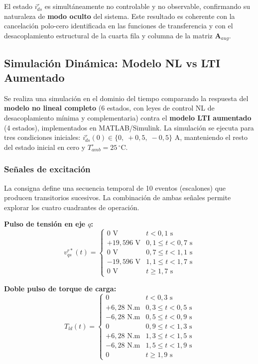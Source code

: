 \documentclass[12pt, a4paper,journal, onecolumn, compsoc]{IEEEtran}
\begin{document}
El estado $i_{ds}^r$ es simultáneamente no controlable y no observable, confirmando su naturaleza de \textbf{modo oculto} del sistema. Este resultado es coherente con la cancelación polo-cero identificada en las funciones de transferencia y con el desacoplamiento estructural de la cuarta fila y columna de la matriz $\mathbf{A}_{aug}$.

\subsection{Simulación Dinámica: Modelo NL vs LTI Aumentado}
\label{sec:sim_dinamica}

Se realiza una simulación en el dominio del tiempo comparando la respuesta del \textbf{modelo no lineal completo} (6 estados, con leyes de control NL de desacoplamiento mínima y complementaria) contra el \textbf{modelo LTI aumentado} (4 estados), implementados en MATLAB/Simulink. La simulación se ejecuta para tres condiciones iniciales: $i_{ds}^r(0) \in \{0,\; +0{,}5,\; -0{,}5\}$ A, manteniendo el resto del estado inicial en cero y $T_{amb}^\circ = 25\,^\circ$C.

\subsubsection{Señales de excitación}

La consigna define una secuencia temporal de 10 eventos (escalones) que producen transitorios sucesivos. La combinación de ambas señales permite explorar los cuatro cuadrantes de operación.

\textbf{Pulso de tensión en eje $q$:}
\begin{equation}
v_{qs}^{r*}(t) = \begin{cases}
0 \text{ V} & t < 0{,}1 \text{ s} \\
+19{,}596 \text{ V} & 0{,}1 \leq t < 0{,}7 \text{ s} \\
0 \text{ V} & 0{,}7 \leq t < 1{,}1 \text{ s} \\
-19{,}596 \text{ V} & 1{,}1 \leq t < 1{,}7 \text{ s} \\
0 \text{ V} & t \geq 1{,}7 \text{ s}
\end{cases}
\end{equation}

\textbf{Doble pulso de torque de carga:}
\begin{equation}
T_{ld}(t) = \begin{cases}
0 & t < 0{,}3 \text{ s} \\
+6{,}28 \text{ N.m} & 0{,}3 \leq t < 0{,}5 \text{ s} \\
-6{,}28 \text{ N.m} & 0{,}5 \leq t < 0{,}9 \text{ s} \\
0 & 0{,}9 \leq t < 1{,}3 \text{ s} \\
+6{,}28 \text{ N.m} & 1{,}3 \leq t < 1{,}5 \text{ s} \\
-6{,}28 \text{ N.m} & 1{,}5 \leq t < 1{,}9 \text{ s} \\
0 & t \geq 1{,}9 \text{ s}
\end{cases}
\end{equation}
\end{document}
